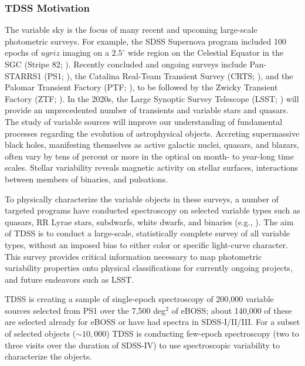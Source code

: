 \subsubsection{TDSS Motivation} 

The variable sky is the focus of many recent and upcoming large-scale
photometric surveys. For example, the SDSS Supernova program included
100 epochs of $ugriz$ imaging on a $2.5^\circ$ wide region on the
Celestial Equator in the SGC (Stripe 82; \citealt{sesar07a}). Recently
concluded and ongoing surveys include Pan-STARRS1
(PS1; \citealt{kaiser10a}), the Catalina Real-Team Transient Survey
(CRTS; \citealt{drake09a}), and the Palomar Transient Factory
(PTF; \citealt{law09a}), to be followed by the Zwicky Transient
Factory (ZTF; \citealt{bellm14a, smith14a}). In the 2020s, the Large
Synoptic Survey Telescope (LSST; \citealt{lsst09a}) will provide an
unprecedented number of transients and variable stars and quasars. The
study of variable sources will improve our understanding of
fundamental processes regarding the evolution of astrophysical
objects.  Accreting supermassive black holes, manifesting themselves
as active galactic nuclei, quasars, and blazars, often vary by tens of
percent or more in the optical on month- to year-long time
scales. Stellar variability reveals magnetic activity on stellar
surfaces, interactions between members of binaries, and pulsations.

To physically characterize the variable objects in these surveys, a
number of targeted programs have conducted spectroscopy on selected
variable types such as quasars, RR Lyrae stars, subdwarfs, white
dwarfs, and binaries (e.g., \citealt{geier11a, palanquedelabrouille11a,
rebassamansergas11a, badenes13a, drake13a}). The aim of TDSS
is to conduct a large-scale, statistically complete survey of all
variable types, without an imposed bias to either color or specific
light-curve character. This survey provides critical information
necessary to map photometric variability properties onto physical
classifications for currently ongoing projects, and future endeavors
such as LSST.

TDSS is creating a sample of single-epoch spectroscopy of 200,000
variable sources selected from PS1 over the 7,500 deg$^2$ of eBOSS;
about 140,000 of these are selected already for eBOSS or have had
spectra in SDSS-I/II/III. For a subset of selected objects ($\sim
10,000$) TDSS is conducting few-epoch spectroscopy (two to three
visits over the duration of SDSS-IV) to use spectroscopic variability
to characterize the objects.

